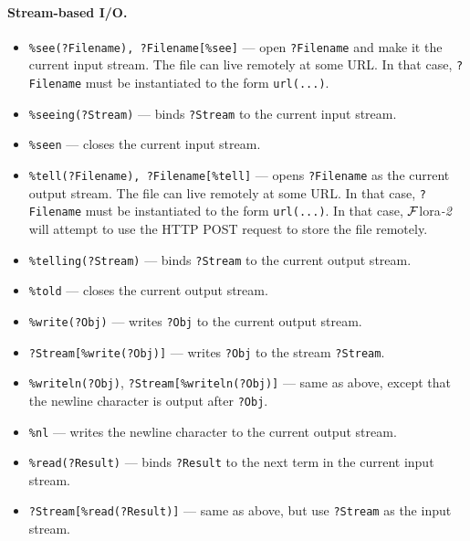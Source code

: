 \documentclass[11pt]{article}
\newcommand{\FLORA}{{\mbox{\sc ${\cal F}${lora}\rm\emph{-2}}}\xspace}
\begin{document}
\paragraph{Stream-based I/O.}
\begin{itemize}
\item  {\tt \%see(?Filename), ?Filename[\%see]} --- open {\tt ?Filename} and make it the
  current input stream.
  The file can live remotely at some URL. In that case, {\tt ?Filename}
  must be instantiated to the form {\tt url(...)}.  
\item {\tt \verb|%|seeing(?Stream)} --- binds {\tt ?Stream} to the current input
  stream.
\item {\tt \verb|%|seen} --- closes the current input stream.
\item {\tt \%tell(?Filename), ?Filename[\%tell]} --- opens {\tt ?Filename} as the current output
  stream. The file can live remotely at some URL. In that case, {\tt ?Filename}
  must be instantiated to the form {\tt url(...)}.
  In that case, \FLORA will attempt to use the HTTP POST request to store
  the file remotely.
\item {\tt \verb|%|telling(?Stream)} --- binds {\tt ?Stream} to the current output
  stream. 
\item {\tt \verb|%|told} --- closes the current output stream.
\item {\tt \verb|%|write(?Obj)} --- writes {\tt ?Obj} to the current output stream.
\item {\tt ?Stream[\%write(?Obj)]} --- writes {\tt ?Obj} to the stream {\tt ?Stream}.
\item {\tt \verb|%|writeln(?Obj)}, {\tt ?Stream[\%writeln(?Obj)]} --- same as above,
  except that the newline character is output after {\tt ?Obj}.
\item {\tt \verb|%|nl} --- writes the newline character to the current output
  stream.
\item {\tt \verb|%|read(?Result)} --- binds {\tt ?Result} to the next term in the
  current input stream.
\item {\tt ?Stream[\%read(?Result)]} --- same as above, but use {\tt ?Stream}
  as the input stream.
\end{itemize}
\end{document}
